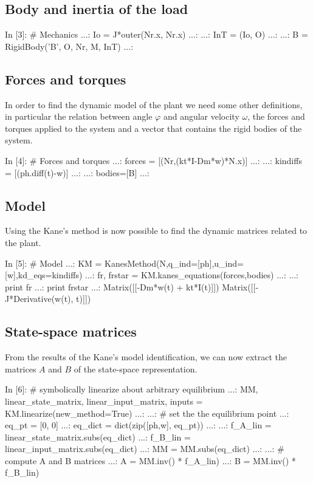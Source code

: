 \subsection{Body and inertia of the load}
\begin{code}
In [3]: # Mechanics
   ...: Io = J*outer(Nr.x, Nr.x)
   ...: 
   ...: InT = (Io, O)
   ...: 
   ...: B = RigidBody('B', O, Nr, M, InT)
   ...: 
\end{code}

\subsection{Forces and torques}
In order to find the dynamic model of the plant we need some other definitions, 
in particular the relation between angle $\varphi$ and angular velocity 
$\omega$, the forces and torques applied to the system and a vector that 
contains the rigid bodies of the system.

\begin{code}
In [4]: # Forces and torques
   ...: forces = [(Nr,(kt*I-Dm*w)*N.x)]
   ...: 
   ...: kindiffs = [(ph.diff(t)-w)]
   ...: 
   ...: bodies=[B]
   ...: 
\end{code}

\subsection{Model}

Using the Kane's method is now possible to find the dynamic matrices related to 
the plant.

\begin{code}
In [5]: # Model
   ...: KM = KanesMethod(N,q_ind=[ph],u_ind=[w],kd_eqs=kindiffs)
   ...: fr, frstar = KM.kanes_equations(forces,bodies)
   ...: 
   ...: print fr
   ...: print frstar
   ...: 
Matrix([[-Dm*w(t) + kt*I(t)]])
Matrix([[-J*Derivative(w(t), t)]])
\end{code}

\subsection{State-space matrices}
From the results of the Kane's model identification, we can now extract the 
matrices $A$ and $B$ of the state-space representation.

\begin{code}
In [6]: # symbolically linearize about arbitrary equilibrium
   ...: MM, linear_state_matrix, linear_input_matrix, inputs = 
KM.linearize(new_method=True)
   ...: 
   ...: # set the the equilibrium point
   ...: eq_pt = [0, 0]
   ...: eq_dict = dict(zip([ph,w], eq_pt))
   ...: 
   ...: f_A_lin = linear_state_matrix.subs(eq_dict)
   ...: f_B_lin = linear_input_matrix.subs(eq_dict)
   ...: MM = MM.subs(eq_dict)
   ...: 
   ...: # compute A and B matrices
   ...: A = MM.inv() * f_A_lin)
   ...: B = MM.inv() * f_B_lin)
\end{code}

